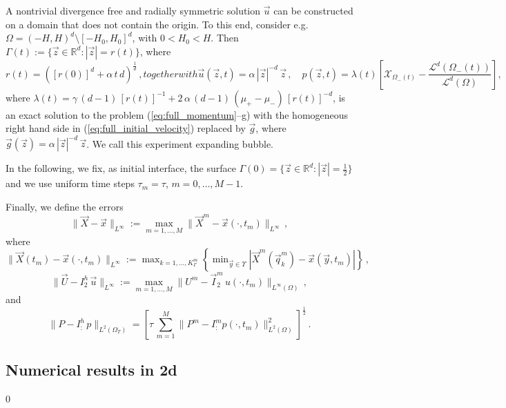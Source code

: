 \documentclass[a4paper,12pt,onecolumn]{article}
\newcommand{\R}{{\mathbb R}}
\newcommand{\bigchi}{\ensuremath{\mathrm{\mathcal{X}}}}
\newcommand{\charfcn}[1]{\bigchi_{#1}} %
\newcommand{\errorXx}{\|\vec{X} - \vec{x}\|_{L^\infty}}
\newcommand{\errorUu}[1]{\|\vec U - I^h_{#1}\,\vec u\|_{L^\infty}}
\newcommand{\LerrorPp}[1]{\|P - I^h_{#1}\,p\|_{L^2(\Omega_T)}}
\begin{document}
A nontrivial divergence free and radially symmetric solution $\vec u$ can be constructed on a domain that does not contain the origin. To this end, consider e.g.\ $\Omega = (-H,H)^d \setminus [-H_0, H_0]^d$, with $0 < H_0 < H$. Then $\Gamma(t) := \{ \vec z \in \R^d : |\vec z| = r(t)\}$, where
\begin{subequations}
\begin{equation} \label{eq:radialr2}
r(t) = ([r(0)]^d + \alpha\,t\,d)^\frac1d \,,
\end{equation}
together with 
\begin{equation} \label{eq:radialup2}
\vec u(\vec z, t) = \alpha\,|\vec z|^{-d}\,\vec z \,, \quad
p(\vec z, t) = \lambda(t)\left[ \charfcn{\Omega_-(t)} - 
\frac{\mathcal{L}^d(\Omega_-(t))}{\mathcal{L}^d(\Omega)}\right],
\end{equation}
\end{subequations}
where $\lambda(t) = \gamma\,(d-1)\,[r(t)]^{-1} + 2\,\alpha\,(d-1)\,(\mu_+ - \mu_-)\,[r(t)]^{-d}$, is an exact solution to the problem (\ref{eq:full_momentum}--g) with the homogeneous right hand side in (\ref{eq:full_initial_velocity}) replaced by $\vec g$, where $\vec g(\vec z) = \alpha\,|\vec z|^{-d}\,\vec z$. We call this experiment expanding bubble.

In the following, we fix, as initial interface, the surface $\Gamma(0) = \{ \vec z \in \R^d : |\vec z| = \frac12 \}$ and we use uniform time steps $\tau_m=\tau$, $m=0,\ldots, M-1$.

Finally, we define the errors 
\begin{equation*}
\errorXx := \max_{m=1,\ldots, M} \|\vec{X}^m - \vec{x}(\cdot,t_m)\|_{L^\infty}\,, 
\end{equation*}
where $\|\vec{X}(t_m) - \vec{x}(\cdot,t_m)\|_{L^\infty} :=\max_{k=1,\ldots, K^m_\Gamma} \left\{\min_{\vec{y}\in \Upsilon} |\vec{X}^m(\vec{q}^m_k) - \vec{x}(\vec{y},t_m)|\right\}\,,$
\begin{equation*} 
\errorUu2 := \max_{m=1,\ldots, M}\|U^m - \vec I^m_2\,u(\cdot,t_m)\|_{L^\infty(\Omega)}\,, 
\end{equation*}
and
\begin{equation*}
\LerrorPp := \left[\tau\,\sum_{m=1}^M \|P^m - I^m_:p(\cdot,t_m)\|_{L^2(\Omega)}^2 \right]^\frac12\,. 
\end{equation*}

\subsection{Numerical results in 2d} \label{subsec:numerical_results_2d}
\setcounter{equation} 0
\end{document}
